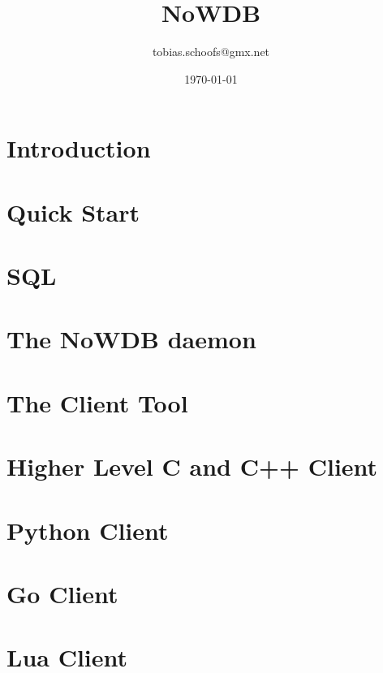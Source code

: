 \documentclass{scrreprt}
\begin{document}
\setlength{\parindent}{0pt}
\setlength{\parskip}{8pt}

\title {NoWDB}
\author {tobias.schoofs@gmx.net}
\date{\today}
\maketitle
\tableofcontents

\chapter{Introduction}\label{chpt_intro} 

\chapter{Quick Start}\label{chpt_quickst}


\chapter{SQL}\label{chpt_sql}


\chapter{The NoWDB daemon}\label{chpt_nowdbd}

\chapter{The Client Tool}\label{chpt_clienttool}

\chapter{Higher Level C and C++ Client}\label{chpt_ccpp}

\chapter{Python Client}\label{chpt_pythonclient}


\chapter{Go Client}\label{chpt_goclient}

\chapter{Lua Client}\label{chpt_luaclient}
\end{document}
